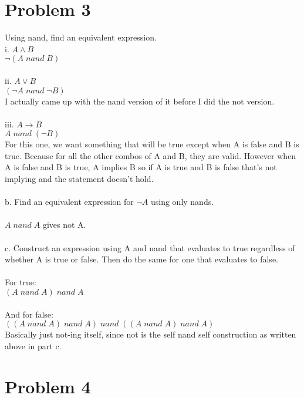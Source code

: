 \documentclass{article}
\begin{document}
\section{Problem 3}
Using nand, find an equivalent expression.
\\
i. $A \wedge B$
\\
$\neg (A \; nand \; B)$
\\\\
ii. $A \vee B$
\\
$(\neg A \; nand \; \neg B)$
\\
I actually came up with the nand version of it before I did the not version.
\\\\
iii. $A \rightarrow B$
\\
$A \; nand \; (\neg B)$
\\
For this one, we want something that will be true except when A is false and B is true. Because for all the other combos of A and B, they are valid. However when A is false and B is true, A implies B so if A is true and B is false that's not implying and the statement doesn't hold.
\\\\
b. Find an equivalent expression for $\neg A$ using only nands.
\\\\
$A \; nand \; A$ gives not A.
\\\\
c. Construct an expression using A and nand that evaluates to true regardless of whether A is true or false. Then do the same for one that evaluates to false.
\\\\
For true:
\\
$(A \; nand \; A) \; nand \; A$
\\\\
And for false:\\
$((A \; nand \; A) \; nand \; A) \; nand \; ((A \; nand \; A) \; nand \; A)$
\\
Basically just not-ing itself, since not is the self nand self construction as written above in part c. 
\\
\section{Problem 4}
\end{document}
